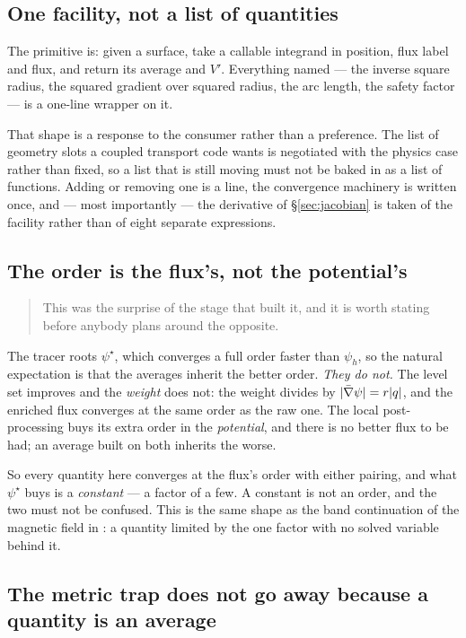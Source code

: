 \subsection{One facility, not a list of quantities}

The primitive is: given a surface, take a callable integrand in position, flux
label and flux, and return its average and $V'$. Everything named --- the inverse
square radius, the squared gradient over squared radius, the arc length, the
safety factor --- is a one-line wrapper on it.

That shape is a response to the consumer rather than a preference. The list of
geometry slots a coupled transport code wants is negotiated with the physics case
rather than fixed, so a list that is still moving must not be baked in as a list
of functions. Adding or removing one is a line, the convergence machinery is
written once, and --- most importantly --- the derivative of
\S\ref{sec:jacobian} is taken of the facility rather than of eight separate
expressions.

\subsection{The order is the flux's, not the potential's}

\begin{quote}
	This was the surprise of the stage that built it, and it is worth stating
	before anybody plans around the opposite.
\end{quote}

The tracer roots $\psi^{\star}$, which converges a full order faster than
$\psi_h$, so the natural expectation is that the averages inherit the better
order. \emph{They do not.} The level set improves and the \emph{weight} does not:
the weight divides by $|\bar{\nabla}\psi| = r|q|$, and the enriched flux converges at
the same order as the raw one. The local post-processing buys its extra order in
the \emph{potential}, and there is no better flux to be had; an average built on
both inherits the worse.

So every quantity here converges at the flux's order with either pairing, and
what $\psi^{\star}$ buys is a \emph{constant} --- a factor of a few. A constant
is not an order, and the two must not be confused. This is the same shape as the
band continuation of the magnetic field in : a quantity limited
by the one factor with no solved variable behind it.

\subsection{The metric trap does not go away because a quantity is an average}

